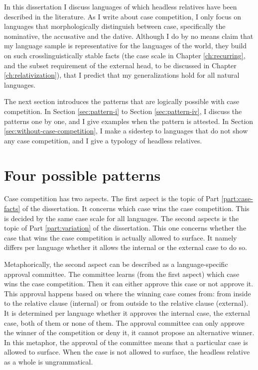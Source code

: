 In this dissertation I discuss languages of which headless relatives have been described in the literature. As I write about case competition, I only focus on languages that morphologically distinguish between case, specifically the nominative, the accusative and the dative. Although I do by no means claim that my language sample is representative for the languages of the world, they build on such crosslinguistically stable facts (the case scale in Chapter \ref{ch:recurring}, and the subset requirement of the external head, to be discussed in Chapter \ref{ch:relativization}), that I predict that my generalizations hold for all natural languages.

The next section introduces the patterns that are logically possible with case competition. In Section \ref{sec:pattern-i} to Section \ref{sec:pattern-iv}, I discuss the patterns one by one, and I give examples when the pattern is attested. In Section \ref{sec:without-case-competition}, I make a sidestep to languages that do not show any case competition, and I give a typology of headless relatives.


\section{Four possible patterns}\label{sec:possible-patterns}

Case competition has two aspects. The first aspect is the topic of Part \ref{part:case-facts} of the dissertation. It concerns which case wins the case competition. This is decided by the same case scale for all languages. The second aspects is the topic of Part \ref{part:variation} of the dissertation. This one concerns whether the case that wins the case competition is actually allowed to surface. It namely differs per language whether it allows the internal or the external case to do so.

Metaphorically, the second aspect can be described as a language-specific approval committee. The committee learns (from the first aspect) which case wins the case competition. Then it can either approve this case or not approve it. This approval happens based on where the winning case comes from: from inside to the relative clause (internal) or from outside to the relative clause (external). It is determined per language whether it approves the internal case, the external case, both of them or none of them. The approval committee can only approve the winner of the competition or deny it, it cannot propose an alternative winner. In this metaphor, the approval of the committee means that a particular case is allowed to surface. When the case is not allowed to surface, the headless relative as a whole is ungrammatical.

